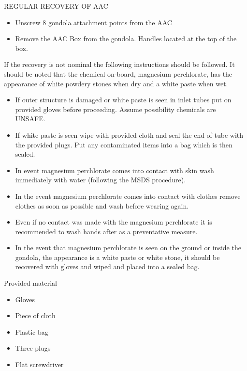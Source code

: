 REGULAR RECOVERY OF AAC

\begin{itemize}
    \item Unscrew 8 gondola attachment points from the AAC
    \item Remove the AAC Box from the gondola. Handles located at the top of the box. 
\end{itemize}

If the recovery is not nominal the following instructions should be followed. It should be noted that the chemical on-board, magnesium perchlorate, has the appearance of white powdery stones when dry and a white paste when wet.

\begin{itemize}
    \item If outer structure is damaged or white paste is seen in inlet tubes put on provided gloves before proceeding. Assume possibility chemicals are UNSAFE.
    \item If white paste is seen wipe with provided cloth and seal the end of tube with the provided plugs. Put any contaminated items into a bag which is then sealed.
    \item In event magnesium perchlorate comes into contact with skin wash immediately with water (following the MSDS procedure).
    \item In the event magnesium perchlorate comes into contact with clothes remove clothes as soon as possible and wash before wearing again.
    \item Even if no contact was made with the magnesium perchlorate it is recommended to wash hands after as a preventative measure.
    \item In the event that magnesium perchlorate is seen on the ground or inside the gondola, the appearance is a white paste or white stone, it should be recovered with gloves and wiped and placed into a sealed bag.
\end{itemize}

Provided material
\begin{itemize}
    \item Gloves
    \item Piece of cloth
    \item Plastic bag
    \item Three plugs
    \item Flat screwdriver
\end{itemize}

\newpage

\newpage

